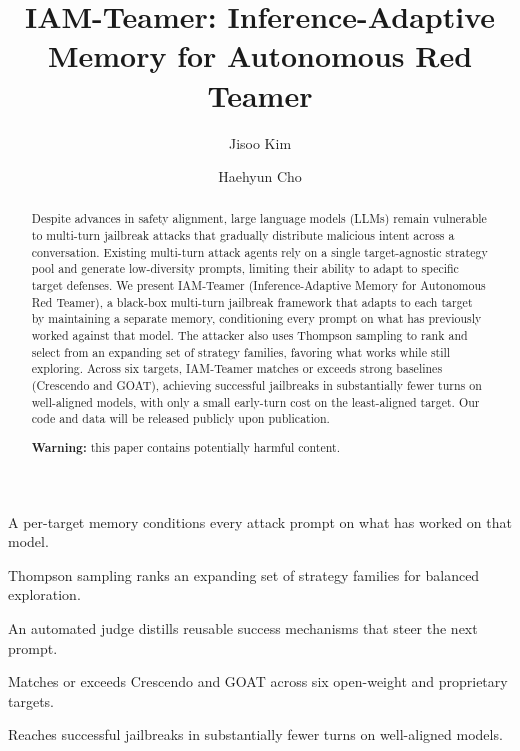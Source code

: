 \documentclass[a4paper,fleqn]{cas-sc}
\begin{document}
\let\WriteBookmarks\relax
\def\floatpagepagefraction{1}
\def\textpagefraction{.001}


\title[mode=title]{IAM-Teamer: Inference-Adaptive Memory for Autonomous Red Teamer}

\author[1]{Jisoo Kim}


\author[1]{Haehyun Cho}
\cormark[1]


\begin{abstract}
  Despite advances in safety alignment, large language models (LLMs) remain vulnerable to multi-turn jailbreak attacks that gradually distribute malicious intent across a conversation.
  Existing multi-turn attack agents rely on a single target-agnostic strategy pool and generate low-diversity prompts, limiting their ability to adapt to specific target defenses.
  We present IAM-Teamer (Inference-Adaptive Memory for Autonomous Red Teamer), a black-box multi-turn jailbreak framework that adapts to each target by maintaining a separate memory, conditioning every prompt on what has previously worked against that model.
  The attacker also uses Thompson sampling to rank and select from an expanding set of strategy families, favoring what works while still exploring.
  Across six targets, IAM-Teamer matches or exceeds strong baselines (Crescendo and GOAT), achieving successful jailbreaks in substantially fewer turns on well-aligned models, with only a small early-turn cost on the least-aligned target.
  Our code and data will be released publicly upon publication.

  \smallskip
  \noindent\textbf{Warning:} this paper contains potentially harmful content.
\end{abstract}

\begin{highlights}
\item A per-target memory conditions every attack prompt on what has worked on that model.
\item Thompson sampling ranks an expanding set of strategy families for balanced exploration.
\item An automated judge distills reusable success mechanisms that steer the next prompt.
\item Matches or exceeds Crescendo and GOAT across six open-weight and proprietary targets.
\item Reaches successful jailbreaks in substantially fewer turns on well-aligned models.
\end{highlights}
\end{document}
